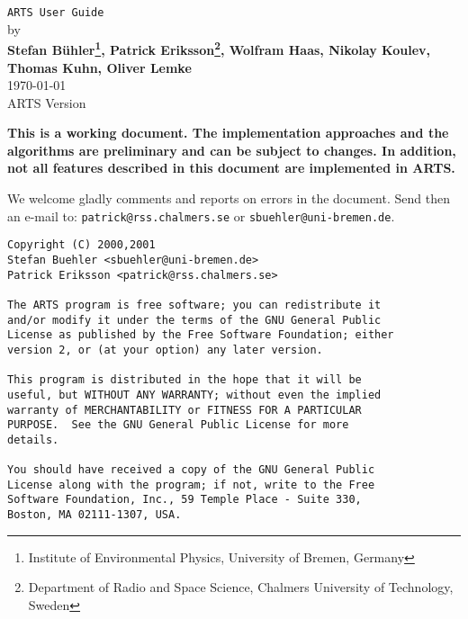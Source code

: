 





%
%
\thispagestyle{plain}
\begin{center}
  \vspace*{2cm}
  {\Huge \verb|ARTS User Guide|\\}
  \vspace*{1cm}
  {\large by \\}
  \vspace*{1cm}
  {\large \bf Stefan B\"uhler\footnote{Institute of Environmental
      Physics, University of Bremen, Germany}, Patrick
    Eriksson\footnote{Department of Radio and Space Science, Chalmers
    University of Technology, Sweden}, Wolfram Haas, Nikolay
    Koulev\footnotemark[1], Thomas Kuhn\footnotemark[1], Oliver
    Lemke\footnotemark[1]}\\
   \vspace*{2cm}
   {\large \today\\
    ARTS Version 
   }
\end{center}
  \vspace*{4cm}
{\normalsize \bf
  \noindent
  This is a working document. The implementation approaches and the
  algorithms are preliminary and can be subject to changes. In addition,
  not all features described in this document are implemented in ARTS.
  
  We welcome gladly comments and reports on errors in the document.
  Send then an e-mail to: \verb|patrick@rss.chalmers.se| or 
  \verb|sbuehler@uni-bremen.de|.
}

\newpage                          
\thispagestyle{empty}
\vspace*{\fill}
\noindent
\begin{verbatim}
Copyright (C) 2000,2001 
Stefan Buehler <sbuehler@uni-bremen.de>
Patrick Eriksson <patrick@rss.chalmers.se>

The ARTS program is free software; you can redistribute it
and/or modify it under the terms of the GNU General Public
License as published by the Free Software Foundation; either
version 2, or (at your option) any later version.

This program is distributed in the hope that it will be
useful, but WITHOUT ANY WARRANTY; without even the implied
warranty of MERCHANTABILITY or FITNESS FOR A PARTICULAR
PURPOSE.  See the GNU General Public License for more
details. 

You should have received a copy of the GNU General Public
License along with the program; if not, write to the Free
Software Foundation, Inc., 59 Temple Place - Suite 330,
Boston, MA 02111-1307, USA. 
\end{verbatim}
\cleardoublepage

